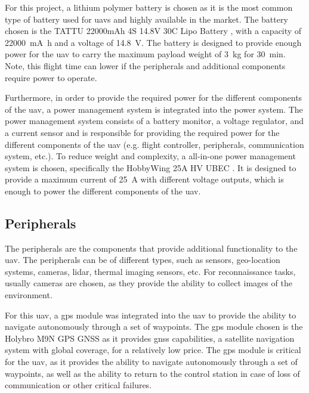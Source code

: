 For this project, a lithium polymer battery is chosen as it is the most common type of battery used for \glspl{uav} and highly available in the market. The battery chosen is the TATTU 22000mAh 4S 14.8V 30C Lipo Battery \autocite{rcinnovationsComprarBatera}, with a capacity of \SI{22000}{\milli\ampere\hour} and a voltage of \SI{14.8}{\volt}. The battery is designed to provide enough power for the \gls{uav} to carry the maximum payload weight of \SI{3}{\kilo\gram} for \SI{30}{\minute}. Note, this flight time can lower if the peripherals and additional components require power to operate.

Furthermore, in order to provide the required power for the different components of the \gls{uav}, a power management system is integrated into the power system. The power management system consists of a battery monitor, a voltage regulator, and a current sensor and is responsible for providing the required power for the different components of the \gls{uav} (e.g. flight controller, peripherals, communication system, etc.). To reduce weight and complexity, a all-in-one power management system is chosen, specifically the HobbyWing 25A HV UBEC \autocite{rcinnovationsHobbyWingUbec}. It is designed to provide a maximum current of \SI{25}{\ampere} with different voltage outputs, which is enough to power the different components of the \gls{uav}.

\subsection{Peripherals}

The peripherals are the components that provide additional functionality to the \gls{uav}. The peripherals can be of different types, such as sensors, geo-location systems, cameras, lidar, thermal imaging sensors, etc. For reconnaissance tasks, usually cameras are chosen, as they provide the ability to collect images of the environment.

For this \gls{uav}, a \gls{gps} module was integrated into the \gls{uav} to provide the ability to navigate autonomously through a set of waypoints. The \gls{gps} module chosen is the Holybro M9N GPS GNSS \autocite{rcinnovationsHolybroGNSS} as it provides \gls{gnss} capabilities, a satellite navigation system with global coverage, for a relatively low price. The \gls{gps} module is critical for the \gls{uav}, as it provides the ability to navigate autonomously through a set of waypoints, as well as the ability to return to the control station in case of loss of communication or other critical failures.


